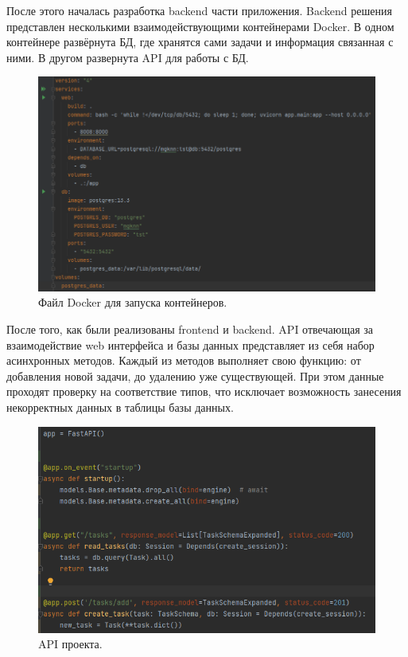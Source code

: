 \documentclass{altsu-report}
\begin{document}
После этого началась разработка backend части приложения. Backend решения представлен несколькими взаимодействующими контейнерами Docker. В одном контейнере развёрнута БД, где хранятся сами задачи и информация связанная с ними. В другом развернута API для работы с БД. 

\begin{figure}
    \centering
    \includegraphics[scale=0.7]{docker.png}
    \caption{Файл Docker для запуска контейнеров.}
    \label{fig:enter-label}
\end{figure}

После того, как были реализованы frontend и backend. API отвечающая за взаимодействие web интерфейса и базы данных представляет из себя набор асинхронных методов. Каждый из методов выполняет свою функцию: от добавления новой задачи, до удалению уже существующей. При этом данные проходят проверку на соответствие типов, что исключает возможность занесения некорректных данных в таблицы базы данных.

\begin{figure}
    \centering
    \includegraphics[scale=0.9]{api.png}
    \caption{API проекта.}
    \label{fig:enter-label}
\end{figure}
\end{document}
